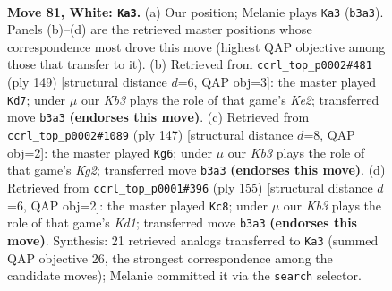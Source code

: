 \documentclass[11pt]{article}
\begin{document}
\clearpage

\begin{figure}[p]\centering
\begin{subfigure}{0.46\textwidth}\centering
\resizebox{\linewidth}{!}{%
\newchessgame
\chessboard[
  setfen={7k/8/PP5n/8/8/1K6/7r/4R3 w - - 1 81},
  showmover=false,
  pgfstyle=straightmove, color=movearrow, markmove={b3-a3}
]}
\caption{}
\end{subfigure}\hfill
\begin{subfigure}{0.46\textwidth}\centering
\resizebox{\linewidth}{!}{%
\newchessgame
\chessboard[
  setfen={8/4k3/2R5/4p3/6K1/8/1rN5/8 b - - 0 75},
  showmover=false,
  pgfstyle=straightmove, color=movearrow, markmove={e7-d7}
]}
\caption{}
\end{subfigure}
\\[4pt]
\begin{subfigure}{0.46\textwidth}\centering
\resizebox{\linewidth}{!}{%
\newchessgame
\chessboard[
  setfen={8/6k1/8/5ppR/3P4/r7/5K1N/8 b - - 10 74},
  showmover=false,
  pgfstyle=straightmove, color=movearrow, markmove={g7-g6}
]}
\caption{}
\end{subfigure}\hfill
\begin{subfigure}{0.46\textwidth}\centering
\resizebox{\linewidth}{!}{%
\newchessgame
\chessboard[
  setfen={3k4/1N5R/8/4p1K1/8/8/8/5r2 b - - 14 78},
  showmover=false,
  pgfstyle=straightmove, color=movearrow, markmove={d8-c8}
]}
\caption{}
\end{subfigure}
\caption{\textbf{Move 81, White: \texttt{Ka3}.} (a) Our position; Melanie plays \texttt{Ka3} (\texttt{b3a3}). Panels (b)--(d) are the retrieved master positions whose correspondence most drove this move (highest QAP objective among those that transfer to it). (b) Retrieved from \texttt{ccrl\_top\_p0002\#481} (ply 149) [structural distance $d$=6, QAP obj=3]: the master played \texttt{Kd7}; under $\mu$ our \emph{Kb3} plays the role of that game's \emph{Ke2}; transferred move \texttt{b3a3} \textbf{(endorses this move)}. (c) Retrieved from \texttt{ccrl\_top\_p0002\#1089} (ply 147) [structural distance $d$=8, QAP obj=2]: the master played \texttt{Kg6}; under $\mu$ our \emph{Kb3} plays the role of that game's \emph{Kg2}; transferred move \texttt{b3a3} \textbf{(endorses this move)}. (d) Retrieved from \texttt{ccrl\_top\_p0001\#396} (ply 155) [structural distance $d$=6, QAP obj=2]: the master played \texttt{Kc8}; under $\mu$ our \emph{Kb3} plays the role of that game's \emph{Kd1}; transferred move \texttt{b3a3} \textbf{(endorses this move)}. Synthesis: 21 retrieved analogs transferred to \texttt{Ka3} (summed QAP objective 26, the strongest correspondence among the candidate moves); Melanie committed it via the \texttt{search} selector.}
\label{fig:thought-m160}
\end{figure}
\end{document}
